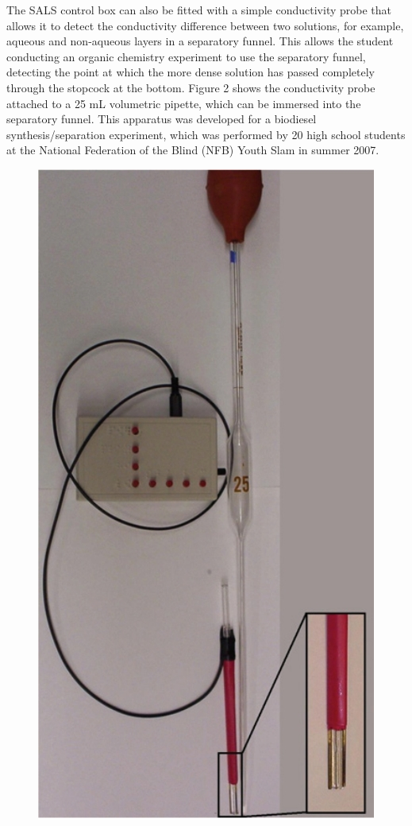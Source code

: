 \documentclass[11.5pt]{sig-alternate} %
\begin{document}
\begin{large}
The SALS control box can also be fitted with a simple conductivity probe that allows it to detect the conductivity difference between two solutions, for example, aqueous and non-aqueous layers in a separatory funnel. This allows the student conducting an organic chemistry experiment to use the separatory funnel, detecting the point at which the more dense solution has passed completely through the stopcock at the bottom. Figure 2 shows the conductivity probe attached to a 25 mL volumetric pipette, which can be immersed into the separatory funnel. This apparatus was developed for a biodiesel synthesis/separation experiment, which was performed by 20 high school students at the National Federation of the Blind (NFB) Youth Slam in summer 2007.

\begin{figure}[!h]
    \centering
    \includegraphics[width=1\linewidth]{fig2.jpeg}

\end{figure}
\end{large}
\end{document}
